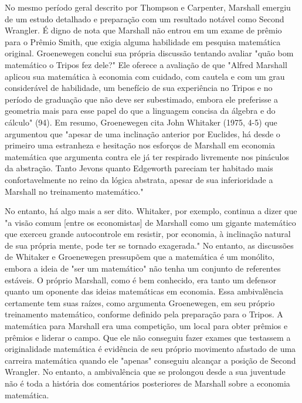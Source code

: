 \documentclass[a4paper,12pt]{article}[abntex2]
\begin{document}
No mesmo período geral descrito por Thompson e Carpenter, Marshall emergiu de um estudo detalhado e preparação com um resultado notável como Second Wrangler. É digno de nota que Marshall não entrou em um exame de prêmio para o Prêmio Smith, que exigia alguma habilidade em pesquisa matemática original. Groenewegen conclui sua própria discussão tentando avaliar "quão bom matemático o Tripos fez dele?" Ele oferece a avaliação de que "Alfred Marshall aplicou sua matemática à economia com cuidado, com cautela e com um grau considerável de habilidade, um benefício de sua experiência no Tripos e no período de graduação que não deve ser subestimado, embora ele preferisse a geometria mais para esse papel do que a linguagem concisa da álgebra e do cálculo" (94). Em resumo, Groenewegen cita John Whitaker (1975, 4-5) que argumentou que "apesar de uma inclinação anterior por Euclides, há desde o primeiro uma estranheza e hesitação nos esforços de Marshall em economia matemática que argumenta contra ele já ter respirado livremente nos pináculos da abstração. Tanto Jevons quanto Edgeworth pareciam ter habitado mais confortavelmente no reino da lógica abstrata, apesar de sua inferioridade a Marshall no treinamento matemático."

No entanto, há algo mais a ser dito. Whitaker, por exemplo, continua a dizer que "a visão comum [entre os economistas] de Marshall como um gigante matemático que exerceu grande autocontrole em resistir, por economia, à inclinação natural de sua própria mente, pode ter se tornado exagerada." No entanto, as discussões de Whitaker e Groenewegen pressupõem que a matemática é um monólito, embora a ideia de "ser um matemático" não tenha um conjunto de referentes estáveis. O próprio Marshall, como é bem conhecido, era tanto um defensor quanto um oponente das ideias matemáticas em economia. Essa ambivalência certamente tem suas raízes, como argumenta Groenewegen, em seu próprio treinamento matemático, conforme definido pela preparação para o Tripos. A matemática para Marshall era uma competição, um local para obter prêmios e prêmios e liderar o campo. Que ele não conseguiu fazer exames que testassem a originalidade matemática é evidência de seu próprio movimento afastado de uma carreira matemática quando ele "apenas" conseguiu alcançar a posição de Second Wrangler. No entanto, a ambivalência que se prolongou desde a sua juventude não é toda a história dos comentários posteriores de Marshall sobre a economia matemática.
\end{document}

